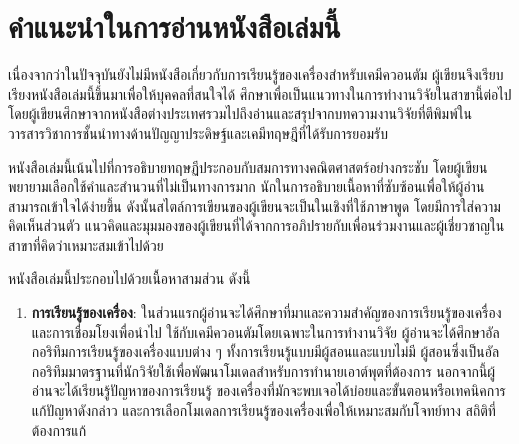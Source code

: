 

{

\chapter*{\centering คำแนะนำในการอ่านหนังสือเล่มนี้}

เนื่องจากว่าในปัจจุบันยังไม่มีหนังสือเกี่ยวกับการเรียนรู้ของเครื่องสำหรับเคมีควอนตัม ผู้เขียนจึงเรียบเรียงหนังสือเล่มนี้ขึ้นมาเพื่อให้บุคคลที่สนใจได้%
ศึกษาเพื่อเป็นแนวทางในการทำงานวิจัยในสาขานี้ต่อไป โดยผู้เขียนศึกษาจากหนังสือต่างประเทศรวมไปถึงอ่านและสรุปจากบทความงานวิจัยที่ตีพิมพ์ใน%
วารสารวิชาการชั้นนำทางด้านปัญญาประดิษฐ์และเคมีทฤษฎีที่ได้รับการยอมรับ

หนังสือเล่มนี้เน้นไปที่การอธิบายทฤษฏีประกอบกับสมการทางคณิตศาสตร์อย่างกระชับ โดยผู้เขียนพยายามเลือกใช้คำและสำนวนที่ไม่เป็นทางการมาก%
นักในการอธิบายเนื้อหาที่ซับซ้อนเพื่อให้ผู้อ่านสามารถเข้าใจได้ง่ายขึ้น ดังนั้นสไตล์การเขียนของผู้เขียนจะเป็นในเชิงที่ใช้ภาษาพูด โดยมีการใส่ความ%
คิดเห็นส่วนตัว แนวคิดและมุมมองของผู้เขียนที่ได้จากการอภิปรายกับเพื่อนร่วมงานและผู้เชี่ยวชาญในสาขาที่คิดว่าเหมาะสมเข้าไปด้วย

หนังสือเล่มนี้ประกอบไปด้วยเนื้อหาสามส่วน ดังนี้ 
%
\begin{enumerate}[topsep=0pt]
    \item \textbf{การเรียนรู้ของเครื่อง}: ในส่วนแรกผู้อ่านจะได้ศึกษาที่มาและความสำคัญของการเรียนรู้ของเครื่องและการเชื่อมโยงเพื่อนำไป%
    ใช้กับเคมีควอนตัมโดยเฉพาะในการทำงานวิจัย ผู้อ่านจะได้ศึกษาอัลกอริทึมการเรียนรู้ของเครื่องแบบต่าง ๆ ทั้งการเรียนรู้แบบมีผู้สอนและแบบไม่มี%
    ผู้สอนซึ่งเป็นอัลกอริทึมมาตรฐานที่นักวิจัยใช้เพื่อพัฒนาโมเดลสำหรับการทำนายเอาต์พุตที่ต้องการ นอกจากนี้ผู้อ่านจะได้เรียนรู้ปัญหาของการเรียนรู้%
    ของเครื่องที่มักจะพบเจอได้บ่อยและขั้นตอนหรือเทคนิคการแก้ปัญหาดังกล่าว และการเลือกโมเดลการเรียนรู้ของเครื่องเพื่อให้เหมาะสมกับโจทย์ทาง%
    สถิติที่ต้องการแก้
    

\end{enumerate}}
